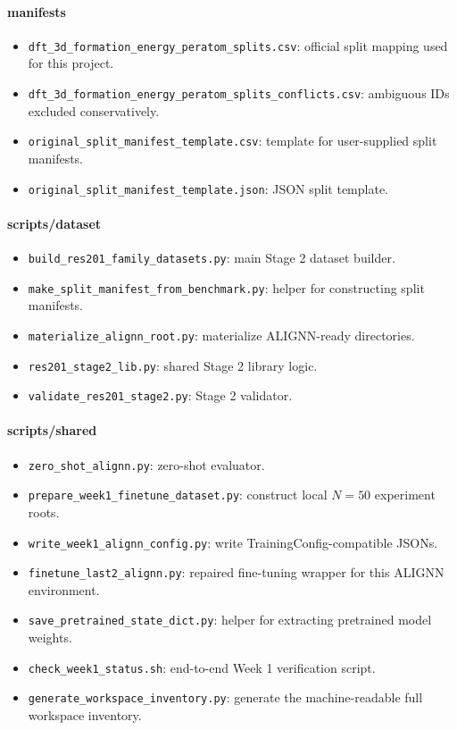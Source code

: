 \documentclass[11pt]{article}
\begin{document}
\paragraph{manifests}
\begin{itemize}
  \item \texttt{dft\_3d\_formation\_energy\_peratom\_splits.csv}: official split mapping used for this project.
  \item \texttt{dft\_3d\_formation\_energy\_peratom\_splits\_conflicts.csv}: ambiguous IDs excluded conservatively.
  \item \texttt{original\_split\_manifest\_template.csv}: template for user-supplied split manifests.
  \item \texttt{original\_split\_manifest\_template.json}: JSON split template.
\end{itemize}

\paragraph{scripts/dataset}
\begin{itemize}
  \item \texttt{build\_res201\_family\_datasets.py}: main Stage 2 dataset builder.
  \item \texttt{make\_split\_manifest\_from\_benchmark.py}: helper for constructing split manifests.
  \item \texttt{materialize\_alignn\_root.py}: materialize ALIGNN-ready directories.
  \item \texttt{res201\_stage2\_lib.py}: shared Stage 2 library logic.
  \item \texttt{validate\_res201\_stage2.py}: Stage 2 validator.
\end{itemize}

\paragraph{scripts/shared}
\begin{itemize}
  \item \texttt{zero\_shot\_alignn.py}: zero-shot evaluator.
  \item \texttt{prepare\_week1\_finetune\_dataset.py}: construct local $N=50$ experiment roots.
  \item \texttt{write\_week1\_alignn\_config.py}: write TrainingConfig-compatible JSONs.
  \item \texttt{finetune\_last2\_alignn.py}: repaired fine-tuning wrapper for this ALIGNN environment.
  \item \texttt{save\_pretrained\_state\_dict.py}: helper for extracting pretrained model weights.
  \item \texttt{check\_week1\_status.sh}: end-to-end Week 1 verification script.
  \item \texttt{generate\_workspace\_inventory.py}: generate the machine-readable full workspace inventory.
\end{itemize}
\end{document}
